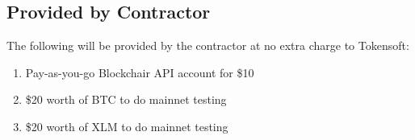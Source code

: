 \subsection{Provided by Contractor}
The following will be provided by the contractor at no extra charge to Tokensoft:
\begin{enumerate}[noitemsep]
\item Pay-as-you-go Blockchair API account for \$10
\item \$20 worth of BTC to do mainnet testing
\item \$20 worth of XLM to do mainnet testing
\end{enumerate}

